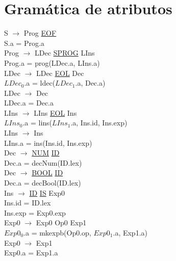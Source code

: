\documentclass[\main/MemoriaPL.tex]{subfiles}
\begin{document}
  \section{Gramática de atributos}
    S $\rightarrow$ Prog \underline{EOF}\\
    \hspace{5mm}S.a = Prog.a\\
    Prog $\rightarrow$ LDec \underline{SPROG} LIns\\
    \hspace{5mm}Prog.a = prog(LDec.a, LIns.a)\\
    LDec $\rightarrow$ LDec \underline{EOL} Dec\\
    \hspace{5mm}$LDec_0$.a = ldec($LDec_1$.a, Dec.a)\\
    LDec $\rightarrow$ Dec\\
    \hspace{5mm}LDec.a = Dec.a\\
    LIns $\rightarrow$ LIns \underline{EOL} Ins\\
    \hspace{5mm}$LIns_0$.a = lins($LIns_1$.a, Ins.id, Ins.exp)\\
    LIns $\rightarrow$ Ins\\
    \hspace{5mm}LIns.a = ins(Ins.id, Ins.exp)\\
    Dec $\rightarrow$ \underline{NUM} \underline{ID}\\
    \hspace{5mm}Dec.a = decNum(ID.lex)\\
    Dec $\rightarrow$ \underline{BOOL} \underline{ID}\\
    \hspace{5mm}Dec.a = decBool(ID.lex)\\
    Ins $\rightarrow$ \underline{ID} \underline{IS} Exp0\\
    \hspace{5mm}Ins.id = ID.lex\\
    \hspace{5mm}Ins.exp = Exp0.exp\\
    Exp0 $\rightarrow$ Exp0 Op0 Exp1\\
    \hspace*{5mm}$Exp0_0$.a = mkexpb(Op0.op, $Exp0_1$.a, Exp1.a)\\
    Exp0 $\rightarrow$ Exp1\\
    \hspace*{5mm}Exp0.a = Exp1.a\\
\end{document}
